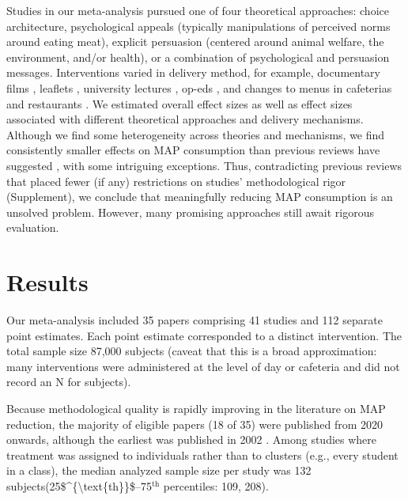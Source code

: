 \documentclass[sn-nature,referee,pdflatex]{sn-jnl}
\begin{document}
Studies in our meta-analysis pursued one of four theoretical approaches:
choice architecture, psychological appeals (typically manipulations of
perceived norms around eating meat), explicit persuasion (centered
around animal welfare, the environment, and/or health), or a combination
of psychological and persuasion messages. Interventions varied in
delivery method, for example, documentary films
\citep{mathur2021effectiveness}, leaflets \citep{peacock2017},
university lectures \citep{jalil2023}, op-eds \citep{haile2021}, and
changes to menus in cafeterias \citep{andersson2021} and restaurants
\citep{coker2022, sparkman2021}. We estimated overall effect sizes as
well as effect sizes associated with different theoretical approaches
and delivery mechanisms. Although we find some heterogeneity across
theories and mechanisms, we find consistently smaller effects on MAP
consumption than previous reviews have suggested
\citep{bianchi2018restructuring, byerly2018, chang2023, harguess2020, kwasny2022, mathur2021meta, meier2022},
with some intriguing exceptions. Thus, contradicting previous reviews
that placed fewer (if any) restrictions on studies' methodological rigor
(Supplement), we conclude that meaningfully reducing MAP consumption is
an unsolved problem. However, many promising approaches still await
rigorous evaluation.

\section{Results}\label{sec2}

Our meta-analysis included 35 papers comprising 41 studies and 112
separate point estimates. Each point estimate corresponded to a distinct
intervention. The total sample size 87,000 subjects (caveat that this is
a broad approximation: many interventions were administered at the level
of day or cafeteria and did not record an N for subjects).

Because methodological quality is rapidly improving in the literature on
MAP reduction, the majority of eligible papers (18 of 35) were published
from 2020 onwards, although the earliest was published in 2002
\citep{allen2002}. Among studies where treatment was assigned to
individuals rather than to clusters (e.g., every student in a class),
the median analyzed sample size per study was 132
subjects(25\$\^{}\{\textbackslash text\{th\}\}\$--75\(^{\text{th}}\)
percentiles: 109, 208).
\end{document}
